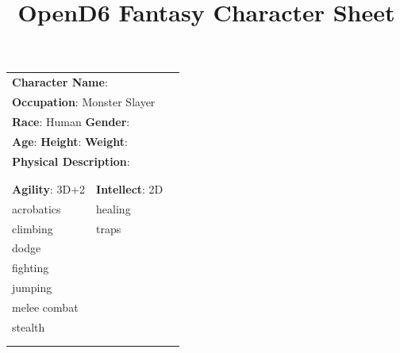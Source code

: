 \documentclass[10pt]{article}
\title{OpenD6 Fantasy Character Sheet}
\begin{document}
\pagestyle{fancy}
\fancyhf{}
\fancyfoot[R]{\thepage}
\renewcommand{\headrulewidth}{0pt}


\cleardoublepage
\begin{table}
\begin{tabular}{m{156pt} m{156pt} m{156pt}}
    \multicolumn{2}{l}{\textbf{Character Name}:  \hrulefill} \\
    \multicolumn{2}{l}{\textbf{Occupation}: Monster Slayer \hrulefill} \\
    \multicolumn{2}{l}{\textbf{Race}: Human \hrulefill \hspace{1em} \textbf{Gender}:  \hrulefill} \\
    \multicolumn{2}{l}{\textbf{Age}:  \hrulefill \hspace{1em} \textbf{Height}:  \hrulefill \hspace{1em}  \textbf{Weight}:  \hrulefill } \\
    \multicolumn{2}{l}{\textbf{Physical Description}:  \hrulefill } \\
    \multicolumn{2}{l}{ \hrulefill } \\
 & & \\
\textbf{Agility}: 3D+2 \hrulefill      & \textbf{Intellect}: 2D \hrulefill  &                             \\

acrobatics           \hrulefill & healing              \hrulefill & \\

climbing             \hrulefill & traps                \hrulefill & \\

dodge                \hrulefill &  \hrulefill & \\

fighting             \hrulefill &  \hrulefill & \\

jumping              \hrulefill &  \hrulefill & \\

melee combat         \hrulefill &  \hrulefill & \\

stealth              \hrulefill &  \hrulefill & \\

 \hrulefill &  \hrulefill & \\

 \hrulefill &  \hrulefill & \\


\end{tabular}
\end{table}
\end{document}

